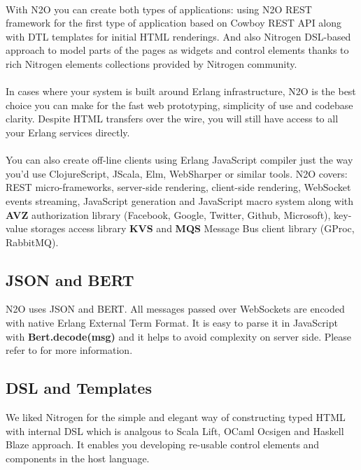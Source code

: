\paragraph{}
With N2O you can create both types of applications: using N2O REST framework
for the first type of application based on Cowboy REST API along with DTL
templates for initial HTML renderings. And also Nitrogen DSL-based approach
to model parts of the pages as widgets and control elements thanks to rich
Nitrogen elements collections provided by Nitrogen community. 

\paragraph{}
In cases where your system is built around Erlang infrastructure, N2O
is the best choice you can make for the fast web prototyping, simplicity
of use and codebase clarity. Despite HTML transfers over the wire,
you will still have access to all your Erlang services directly.

\paragraph{}
You can also create off-line clients using Erlang JavaScript compiler
just the way you'd use ClojureScript, JScala, Elm, WebSharper or similar
tools. N2O covers: REST micro-frameworks, server-side rendering,
client-side rendering, WebSocket events streaming, JavaScript generation
and JavaScript macro system along with {\bf AVZ} authorization
library (Facebook, Google, Twitter, Github, Microsoft), key-value storages
access library {\bf KVS} and {\bf MQS} Message Bus client library (GProc, RabbitMQ).

\subsection{JSON and BERT}
N2O uses JSON and BERT. All messages passed over
WebSockets are encoded with native Erlang External Term Format.
It is easy to parse it in JavaScript with {\bf Bert.decode(msg)}
and it helps to avoid complexity on server side. Please refer
to  for more information.

\subsection{DSL and Templates}
We liked Nitrogen for the simple and elegant way of constructing typed
HTML with internal DSL which is analgous to Scala Lift,
OCaml Ocsigen and Haskell Blaze approach. It enables you developing re-usable control
elements and components in the host language.

